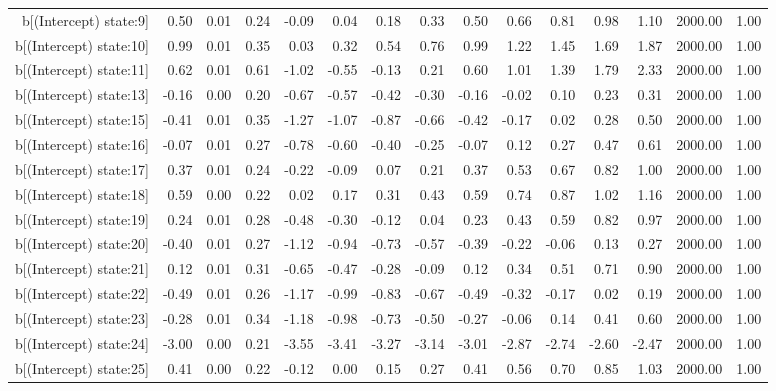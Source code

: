 \begin{table}[ht]
\begin{tabular}{rrrrrrrrrrrrrrr}
  b[(Intercept) state:9] & 0.50 & 0.01 & 0.24 & -0.09 & 0.04 & 0.18 & 0.33 & 0.50 & 0.66 & 0.81 & 0.98 & 1.10 & 2000.00 & 1.00 \\ 
  b[(Intercept) state:10] & 0.99 & 0.01 & 0.35 & 0.03 & 0.32 & 0.54 & 0.76 & 0.99 & 1.22 & 1.45 & 1.69 & 1.87 & 2000.00 & 1.00 \\ 
  b[(Intercept) state:11] & 0.62 & 0.01 & 0.61 & -1.02 & -0.55 & -0.13 & 0.21 & 0.60 & 1.01 & 1.39 & 1.79 & 2.33 & 2000.00 & 1.00 \\ 
  b[(Intercept) state:13] & -0.16 & 0.00 & 0.20 & -0.67 & -0.57 & -0.42 & -0.30 & -0.16 & -0.02 & 0.10 & 0.23 & 0.31 & 2000.00 & 1.00 \\ 
  b[(Intercept) state:15] & -0.41 & 0.01 & 0.35 & -1.27 & -1.07 & -0.87 & -0.66 & -0.42 & -0.17 & 0.02 & 0.28 & 0.50 & 2000.00 & 1.00 \\ 
  b[(Intercept) state:16] & -0.07 & 0.01 & 0.27 & -0.78 & -0.60 & -0.40 & -0.25 & -0.07 & 0.12 & 0.27 & 0.47 & 0.61 & 2000.00 & 1.00 \\ 
  b[(Intercept) state:17] & 0.37 & 0.01 & 0.24 & -0.22 & -0.09 & 0.07 & 0.21 & 0.37 & 0.53 & 0.67 & 0.82 & 1.00 & 2000.00 & 1.00 \\ 
  b[(Intercept) state:18] & 0.59 & 0.00 & 0.22 & 0.02 & 0.17 & 0.31 & 0.43 & 0.59 & 0.74 & 0.87 & 1.02 & 1.16 & 2000.00 & 1.00 \\ 
  b[(Intercept) state:19] & 0.24 & 0.01 & 0.28 & -0.48 & -0.30 & -0.12 & 0.04 & 0.23 & 0.43 & 0.59 & 0.82 & 0.97 & 2000.00 & 1.00 \\ 
  b[(Intercept) state:20] & -0.40 & 0.01 & 0.27 & -1.12 & -0.94 & -0.73 & -0.57 & -0.39 & -0.22 & -0.06 & 0.13 & 0.27 & 2000.00 & 1.00 \\ 
  b[(Intercept) state:21] & 0.12 & 0.01 & 0.31 & -0.65 & -0.47 & -0.28 & -0.09 & 0.12 & 0.34 & 0.51 & 0.71 & 0.90 & 2000.00 & 1.00 \\ 
  b[(Intercept) state:22] & -0.49 & 0.01 & 0.26 & -1.17 & -0.99 & -0.83 & -0.67 & -0.49 & -0.32 & -0.17 & 0.02 & 0.19 & 2000.00 & 1.00 \\ 
  b[(Intercept) state:23] & -0.28 & 0.01 & 0.34 & -1.18 & -0.98 & -0.73 & -0.50 & -0.27 & -0.06 & 0.14 & 0.41 & 0.60 & 2000.00 & 1.00 \\ 
  b[(Intercept) state:24] & -3.00 & 0.00 & 0.21 & -3.55 & -3.41 & -3.27 & -3.14 & -3.01 & -2.87 & -2.74 & -2.60 & -2.47 & 2000.00 & 1.00 \\ 
  b[(Intercept) state:25] & 0.41 & 0.00 & 0.22 & -0.12 & 0.00 & 0.15 & 0.27 & 0.41 & 0.56 & 0.70 & 0.85 & 1.03 & 2000.00 & 1.00 \\ 

\end{tabular}
\end{table}
